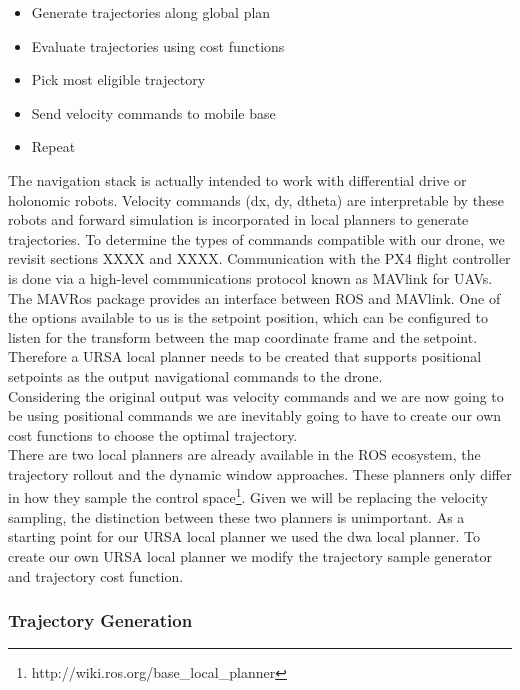 \documentclass[capstone_report.tex]{subfiles}
\begin{document}
\begin{itemize}
    \item Generate trajectories along global plan
    \item Evaluate trajectories using cost functions
    \item Pick most eligible trajectory
    \item Send velocity commands to mobile base
    \item Repeat
\end{itemize}

The navigation stack is actually intended to work with differential drive or holonomic robots.  Velocity commands (dx, dy, dtheta) are interpretable by these robots and forward simulation is incorporated in local planners to generate trajectories.  To determine the types of commands compatible with our drone, we revisit sections XXXX and XXXX.  Communication with the PX4 flight controller is done via a high-level communications protocol known as MAVlink for UAVs.  The MAVRos package provides an interface between ROS and MAVlink.  One of the options available to us is the setpoint position, which can be configured to listen for the transform between the map coordinate frame and the setpoint.  Therefore a URSA local planner needs to be created that supports positional setpoints as the output navigational commands to the drone.\\

Considering the original output was velocity commands and we are now going to be using positional commands we are inevitably going to have to create our own cost functions to choose the optimal trajectory.\\

There are two local planners are already available in the ROS ecosystem, the trajectory rollout and the dynamic window approaches.  These planners only differ in how they sample the control space\footnote{http://wiki.ros.org/base\_local\_planner}.  Given we will be replacing the velocity sampling, the distinction between these two planners is unimportant.  As a starting point for our URSA local planner we used the dwa local planner.  To create our own URSA local planner we modify the trajectory sample generator and trajectory cost function.

\subsubsection{Trajectory Generation} \label{sec: traj_gen}
\end{document}
